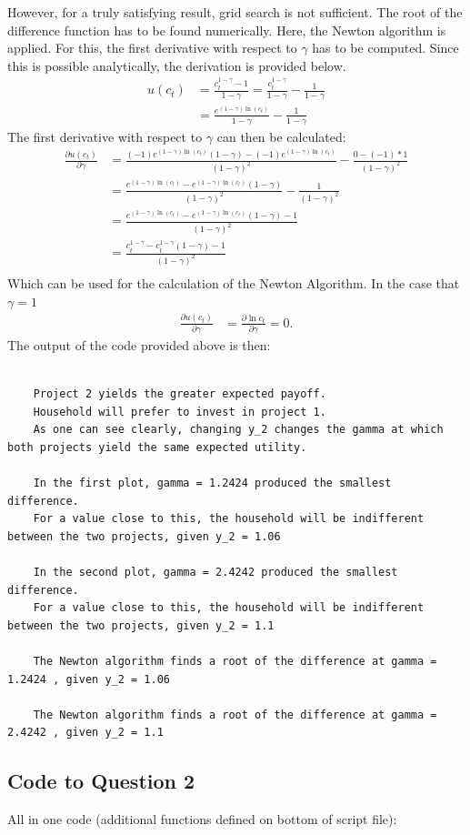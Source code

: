 \documentclass{article}
\begin{document}
	However, for a truly satisfying result, grid search is not sufficient. The root of the difference function has to be found numerically. Here, the Newton algorithm is applied. For this, the first derivative with respect to $\gamma$ has to be computed. Since this is possible analytically, the derivation is provided below.
	\begin{align}
		u(c_t) &= \frac{c_t^{1-\gamma}-1}{1- \gamma} = \frac{c_t^{1-\gamma}}{1- \gamma} -\frac{1}{1- \gamma}\\
		&= \frac{e^{(1-\gamma) \ln (c_t)}}{1- \gamma} -\frac{1}{1- \gamma}
	\end{align}
	The first derivative with respect to $\gamma$ can then be calculated:
	\begin{align}
		\frac{ \partial u(c_t)}{\partial \gamma} &= \frac{(-1)e^{(1-\gamma) \ln (c_t)} (1- \gamma)- (-1)e^{(1-\gamma) \ln (c_t)}}{(1- \gamma)^2} - \frac{0 - (-1)*1}{(1- \gamma)^2} \\
		&= \frac{e^{(1-\gamma) \ln (c_t)}-e^{(1-\gamma) \ln (c_t)} (1- \gamma)}{(1- \gamma)^2} - \frac{1}{(1- \gamma)^2} \\
		&= \frac{e^{(1-\gamma) \ln (c_t)}-e^{(1-\gamma) \ln (c_t)} (1- \gamma)-1}{(1- \gamma)^2} \\
		&= \frac{c_t^{1- \gamma}-c_t^{1- \gamma} (1- \gamma)-1}{(1- \gamma)^2} \\  
	\end{align}
	Which can be used for the calculation of the Newton Algorithm.
	In the case that $ \gamma = 1 $
	\begin{align}\frac{ \partial u(c_t)}{\partial \gamma} &= \frac{ \partial \ln c_t}{\partial \gamma} = 0.
	\end{align}
	The output of the code provided above is then:
	\begin{lstlisting}[style=Matlab-editor]
	
	Project 2 yields the greater expected payoff.
	Household will prefer to invest in project 1.
	As one can see clearly, changing y_2 changes the gamma at which both projects yield the same expected utility.
	
	In the first plot, gamma = 1.2424 produced the smallest difference. 
	For a value close to this, the household will be indifferent between the two projects, given y_2 = 1.06 
	
	In the second plot, gamma = 2.4242 produced the smallest difference. 
	For a value close to this, the household will be indifferent between the two projects, given y_2 = 1.1 
	
	The Newton algorithm finds a root of the difference at gamma = 1.2424 , given y_2 = 1.06 
	
	The Newton algorithm finds a root of the difference at gamma = 2.4242 , given y_2 = 1.1 
	\end{lstlisting}
	\begin{appendices}
		\section{Code to Question 2}
		All in one code (additional functions defined on bottom of script file):
		
	\end{appendices}
\end{document}

